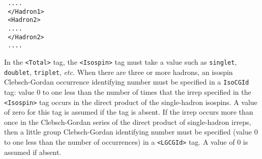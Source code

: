 \documentclass[12pt]{article}
\newcommand{\vb}{\texttt}
\begin{document}
\begin{itemize}
\hspace*{15pt}\texttt{      ....    }\\                                                  
\texttt{   </Hadron1>}\\                                                   
\texttt{   <Hadron2> }\\                                                   
\hspace*{15pt}\texttt{      ....   }\\                                                   
\texttt{   </Hadron2> }\\                                                  
\texttt{   ....     }
\end{itemize}                                                   
In the \vb{<Total>} tag, the \vb{<Isospin>} tag must take a value such  
as \vb{singlet}, \vb{doublet}, \vb{triplet}, \textit{etc.}  When there are      
three or more hadrons, an isospin Clebsch-Gordan occurrence   
identifying number must be specified in a \vb{IsoCGId} tag: value 0 to    
one less than the number of times that the irrep specified in the 
\vb{<Isospin>}
tag occurs in      
the direct product of the single-hadron isospins.  A value    
of zero for this tag is assumed if the tag is absent.         
If the irrep occurs more than once in the Clebsch-Gordan      
series of the direct product of single-hadron irreps, then    
a little group Clebsch-Gordan identifying number      
must be specified (value 0 to one less than the number of     
occurrences) in a \vb{<LGCGId>} tag.  A value of 0 is assumed if absent.             
                                                              
\end{document}
